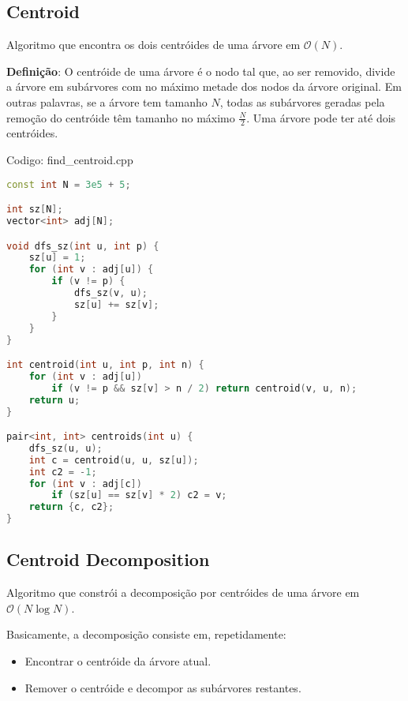 \documentclass[10pt, a4paper, oneside]{book}
\begin{document}
\subsection{Centroid}


Algoritmo que encontra os dois centróides de uma árvore em $\mathcal{O}(N)$.



\textbf{Definição}: O centróide de uma árvore é o nodo tal que, ao ser removido, divide a árvore em subárvores com no máximo metade dos nodos da árvore original. Em outras palavras, se a árvore tem tamanho $N$, todas as subárvores geradas pela remoção do centróide têm tamanho no máximo $\frac{N}{2}$. Uma árvore pode ter até dois centróides.
\hfill

Codigo: find\_centroid.cpp

\begin{lstlisting}[language=C++]
const int N = 3e5 + 5;

int sz[N];
vector<int> adj[N];

void dfs_sz(int u, int p) {
    sz[u] = 1;
    for (int v : adj[u]) {
        if (v != p) {
            dfs_sz(v, u);
            sz[u] += sz[v];
        }
    }
}

int centroid(int u, int p, int n) {
    for (int v : adj[u])
        if (v != p && sz[v] > n / 2) return centroid(v, u, n);
    return u;
}

pair<int, int> centroids(int u) {
    dfs_sz(u, u);
    int c = centroid(u, u, sz[u]);
    int c2 = -1;
    for (int v : adj[c])
        if (sz[u] == sz[v] * 2) c2 = v;
    return {c, c2};
}\end{lstlisting}
\hfill

\subsection{Centroid Decomposition}


Algoritmo que constrói a decomposição por centróides de uma árvore em $\mathcal{O}(N \log N)$.



Basicamente, a decomposição consiste em, repetidamente:



\begin{itemize}
\item Encontrar o centróide da árvore atual.
\item Remover o centróide e decompor as subárvores restantes.
\end{itemize}
\end{document}
